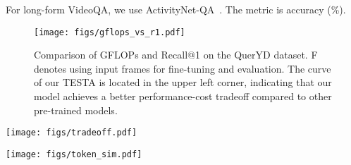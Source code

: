 \documentclass[11pt]{article}
\newcommand{\modelname}{TESTA\xspace}
\begin{document}
For long-form VideoQA, we use ActivityNet-QA~\citep{Yu2019ActivityNetQAAD}. The metric is accuracy (\%).

\begin{figure}[ht]
\centering
\texttt{[image: figs/gflops\_vs\_r1.pdf]}
\caption{Comparison of GFLOPs and Recall@1 on the QuerYD dataset. F denotes using  input frames for fine-tuning and evaluation. The curve of our \modelname is located in the upper left corner, indicating that our model achieves a better performance-cost tradeoff compared to other pre-trained models.}
\label{fig:tradeoff}
\end{figure}





\begin{figure*}[ht]
\centering
\begin{minipage}[b]{0.63\textwidth}
  \centering
{} 
  \caption{Ablation on reduced the token number,  (temporal aggregation), and  (spatial aggregation). The average recall is represented by \textcolor{red}{red stars}, while GFLOPs are depicted by \textcolor{blue}{blue bars}. The dotted lines denote the results without any aggregation ( and ). All results are evaluated on QuerYD with  frames.}
  \label{fig:ablation-r}
\end{minipage}
\hspace{10pt} \begin{minipage}[b]{0.33\textwidth}
    \texttt{[image: figs/tradeoff.pdf]}
    \caption{GFLOPs-Recall tradeoff on QuerYD. We record the performance (dots) of \modelname with various - configurations, and plot the trends (curve) by fitting the dots.}
    \label{fig:tradeoff}
\end{minipage}
\end{figure*}

\begin{figure*}[ht]
\centering
\texttt{[image: figs/token\_sim.pdf]}
\caption{Cosine similarity between tokens from Set  and Set  in various video encoder blocks. The \textcolor{blue}{blue} color indicates frame tokens while the \textcolor{orange}{orange} color indicates patch tokens. For those tokens finally being aggregated, we plot their similarity in a dark color.}
\label{fig:token_sim}
\end{figure*}
\end{document}
